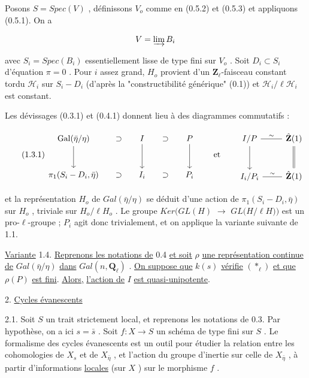 Posons  $S = Spec(V)$ , définissons  $V_o$  comme en (0.5.2) et (0.5.3) et appliquons (0.5.1). On a

\begin{equation*}
V = \varinjlim B_i
\end{equation*}


avec  $S_i = Spec(B_i)$  essentiellement lisse de type fini sur  $V_o$ . Soit  $D_i \subset S_i$  d'équation  $\pi = 0$ . Pour  $i$  assez grand, $H_o$  provient d'un  $\mathbf{Z}_\ell$-faisceau constant tordu  $\mathcal{H}_i$  sur  $S_i - D_i$  (d'après la "constructibilité générique" (0.1)) et  $\mathcal{H}_i/\ell\mathcal{H}_i$  est constant.

Les dévissages (0.3.1) et (0.4.1) donnent lieu à des diagrammes commutatifs :

\begin{equation}\tag{1.3.1}
\begin{tikzcd}[column sep=small, row sep=large]
\mathrm{Gal}(\bar{\eta}/\eta) \arrow[d] & \supset & I \arrow[d] & \supset & P \arrow[d] \\
\pi_1(S_i-D_i,\bar{\eta}) & \supset & I_i & \supset & P_i
\end{tikzcd}
\qquad\text{et}\qquad
\begin{tikzcd}[row sep=large]
I/P \arrow[r, dash, "\sim"] \arrow[d] & \hat{\mathbf{Z}}(1) \arrow[d, equal] \\
I_i/P_i \arrow[r, dash, "\sim"] & \hat{\mathbf{Z}}(1)
\end{tikzcd}
\end{equation}

et la représentation  $H_o$  de  $Gal(\bar{\eta}/\eta)$  se déduit d'une action de  $\pi_1(S_i-D_i,\bar{\eta})$  sur $H_o$ , triviale sur  $H_o/\ell H_o$ . Le groupe  $Ker(GL(H)$ $\longrightarrow$ $GL(H/$$\ell$$H))$  est un pro-$\ell$-groupe ; $P_i$  agit donc trivialement, et on applique la variante suivante de 1.1.

\underline{Variante} 1.4.  \underline{Reprenons les notations de} 0.4 \underline{et soit}  $\rho$  \underline{une représentation continue de} $Gal(\bar{\eta}/\eta)$  \underline{dans}  $Gal(n,\mathbf{Q}_\ell)$ . \underline{On suppose que}  $k(s)$  \underline{vérifie}  $(\ast_\ell)$  \underline{et que}  $\rho(P)$ \underline{est fini}. \underline{Alors,} \underline{l'action de}  $I$  \underline{est quasi-unipotente}.


2. \underline{Cycles évanescents}

2.1.    Soit  $S$  un trait strictement local, et reprenons les notations de 0.3. Par hypothèse, on a ici  $s = \bar{s}$ . Soit  $f : X \longrightarrow S$  un schéma de type fini sur  $S$ . Le formalisme des cycles évanescents est un outil pour étudier la relation entre les cohomologies de  $X_s$  et de  $X_{\bar{\eta}}$ , et l'action du groupe d'inertie sur celle de  $X_{\bar{\eta}}$ , à partir d'informations \underline{locales} (sur  $X$ ) sur le morphisme  $f$ .

